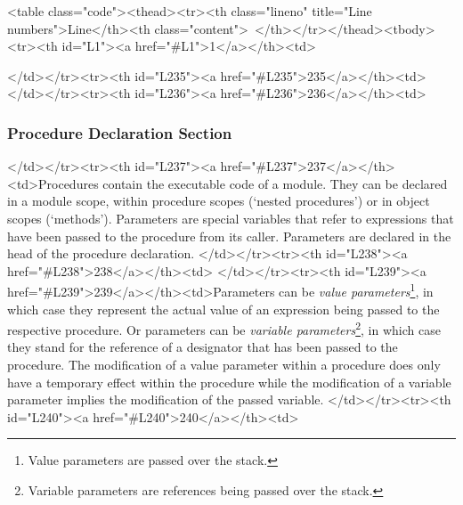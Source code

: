<table class="code"><thead><tr><th class="lineno" title="Line numbers">Line</th><th class="content"> </th></tr></thead><tbody><tr><th id="L1"><a href="#L1">1</a></th><td>\documentclass[a4paper,11pt]{article}
\begin{document}
</td></tr><tr><th id="L235"><a href="#L235">235</a></th><td>
</td></tr><tr><th id="L236"><a href="#L236">236</a></th><td>\subsubsection{Procedure Declaration Section}\label{section:ProcedureDeclarationSection}
</td></tr><tr><th id="L237"><a href="#L237">237</a></th><td>Procedures contain the executable code of a module. They can be declared in a module scope, within procedure scopes (`nested procedures') or in object scopes (`methods'). Parameters are special variables that refer to expressions that have been passed to the procedure from its caller. Parameters are declared in the head of the procedure declaration.
</td></tr><tr><th id="L238"><a href="#L238">238</a></th><td>
</td></tr><tr><th id="L239"><a href="#L239">239</a></th><td>Parameters can be {\em value parameters}\footnote{Value parameters are passed over the stack.}, in which case they represent the actual value of an expression being passed to the respective procedure. Or parameters can be {\em variable parameters}\footnote{Variable parameters are references being passed over the stack.}, in which case they stand for the reference of a designator that has been passed to the procedure. The modification of a value parameter within a procedure does only have a temporary effect within the procedure while the modification of a variable parameter implies the modification of the passed variable.
</td></tr><tr><th id="L240"><a href="#L240">240</a></th><td>
\end{document}
